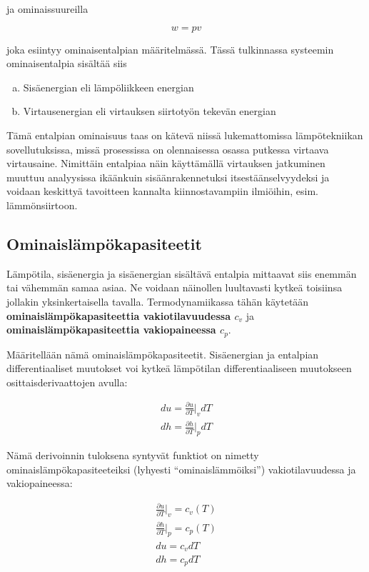 \documentclass[12pt,a4paper,finnish]{book}
\begin{document}
ja ominaissuureilla 

\begin{equation}
 w = pv
\end{equation}

joka esiintyy ominaisentalpian määritelmässä. Tässä tulkinnassa systeemin ominaisentalpia sisältää siis

\begin{enumerate}[a)]
 \item Sisäenergian eli lämpöliikkeen energian
 \item Virtausenergian eli virtauksen siirtotyön tekevän energian
\end{enumerate}

Tämä entalpian ominaisuus taas on kätevä niissä lukemattomissa lämpötekniikan sovellutuksissa, missä prosessissa on 
olennaisessa osassa putkessa virtaava virtausaine. Nimittäin entalpiaa näin käyttämällä virtauksen jatkuminen muuttuu 
analyysissa ikäänkuin sisäänrakennetuksi itsestäänselvyydeksi ja voidaan keskittyä tavoitteen kannalta kiinnostavampiin 
ilmiöihin, esim. lämmönsiirtoon.

\subsection{Ominaislämpökapasiteetit}

Lämpötila, sisäenergia ja sisäenergian sisältävä entalpia mittaavat siis enemmän tai vähemmän samaa asiaa. Ne voidaan 
näinollen luultavasti kytkeä toisiinsa jollakin yksinkertaisella tavalla. Termodynamiikassa tähän käytetään 
\textbf{ominaislämpökapasiteettia vakiotilavuudessa $c_v$} ja \textbf{ominaislämpökapasiteettia  vakiopaineessa $c_p$}.

Määritellään nämä ominaislämpökapasiteetit. Sisäenergian ja entalpian differentiaaliset muutokset voi kytkeä lämpötilan 
differentiaaliseen muutokseen osittaisderivaattojen avulla:

\begin{align}
 du = \frac{\partial u}{\partial T}\bigg|_vdT\\
 dh = \frac{\partial h}{\partial T}\bigg|_pdT
\end{align}

Nämä derivoinnin tuloksena syntyvät funktiot on nimetty ominaislämpökapasiteeteiksi (lyhyesti ``ominaislämmöiksi'') 
vakiotilavuudessa ja vakiopaineessa:

\begin{align}
 \frac{\partial u}{\partial T}\bigg|_v = c_v(T)\\
 \frac{\partial h}{\partial T}\bigg|_p = c_p(T)\\
 du = c_vdT\\
 dh = c_pdT
\end{align}
\end{document}
